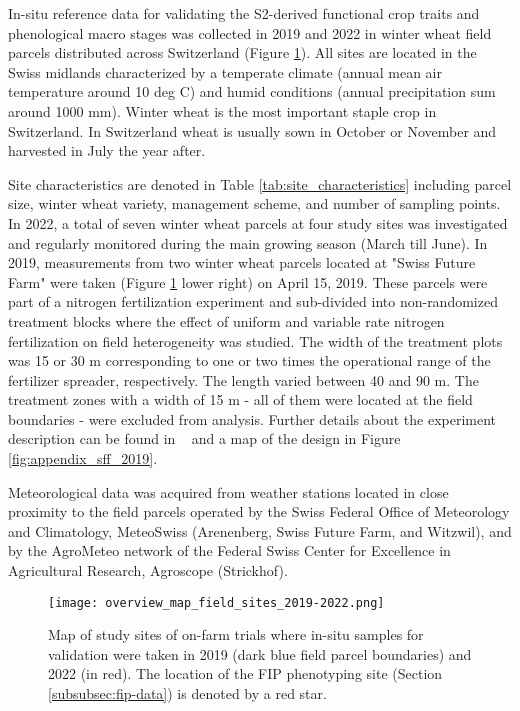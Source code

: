 In-situ reference data for validating the S2-derived functional crop traits and phenological macro stages was collected in 2019 and 2022 in winter wheat field parcels distributed across Switzerland (Figure \ref{fig:overview-map}). All sites are located in the Swiss midlands characterized by a temperate climate (annual mean air temperature around 10 deg C) and humid conditions (annual precipitation sum around 1000 mm). Winter wheat is the most important staple crop in Switzerland. In Switzerland wheat is usually sown in October or November and harvested in July the year after.

Site characteristics are denoted in Table \ref{tab:site_characteristics} including parcel size, winter wheat variety, management scheme, and  number of sampling points. In 2022, a total of seven winter wheat parcels at four study sites was investigated and regularly monitored during the main growing season (March till June). In 2019, measurements from two winter wheat parcels located at "Swiss Future Farm" were taken (Figure \ref{fig:overview-map} lower right) on April 15, 2019. These parcels were part of a nitrogen fertilization experiment and sub-divided into non-randomized treatment blocks where the effect of uniform and variable rate nitrogen fertilization on field heterogeneity was studied. The width of the treatment plots was 15 or 30 m corresponding to one or two times the operational range of the fertilizer spreader, respectively. The length varied between 40 and 90 m. The treatment zones with a width of 15 m - all of them were located at the field boundaries - were excluded from analysis. Further details about the experiment description can be found in ~\cite{argento_investigating_2022} and a map of the design in Figure \ref{fig:appendix_sff_2019}.

Meteorological data was acquired from weather stations located in close proximity to the field parcels operated by the Swiss Federal Office of Meteorology and Climatology, MeteoSwiss (Arenenberg, Swiss Future Farm, and Witzwil), and by the AgroMeteo network of the Federal Swiss Center for Excellence in Agricultural Research, Agroscope (Strickhof). 

\begin{figure}[H]
    \centering
    \texttt{[image: overview\_map\_field\_sites\_2019-2022.png]}
    \caption[Map of study sites of on-farm trials where in-situ samples for validation were taken in 2019 (dark blue field parcel boundaries) and 2022 (in red). The location of the FIP phenotyping site (Section \ref{subsubsec:fip-data}) is denoted by a red star.]{Map of study sites of on-farm trials where in-situ samples for validation were taken in 2019 (dark blue field parcel boundaries) and 2022 (in red). The location of the FIP phenotyping site (Section \ref{subsubsec:fip-data}) is denoted by a red star.}
    \label{fig:overview-map}
\end{figure}


